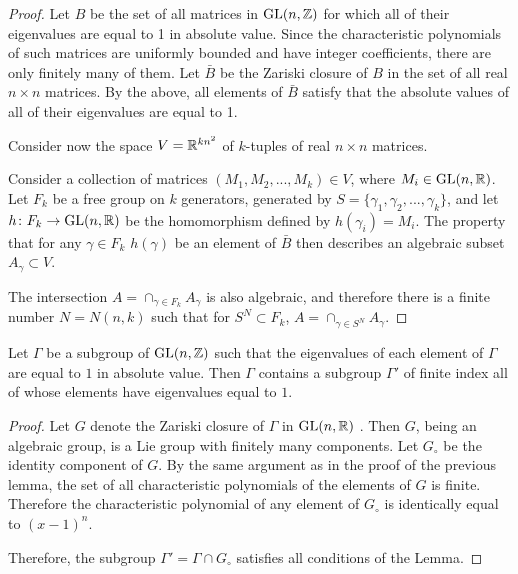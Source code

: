 \documentclass{amsart}
\begin{document}
\begin{proof}

Let $B$ be the set of all matrices in $\mathrm{GL}(n,{\Bbb Z})$
for which all of their eigenvalues are equal to 1 in absolute value.
Since the characteristic polynomials of such matrices
are uniformly bounded and have integer coefficients,
there are only finitely many of them.
Let $\bar{B}$ be the Zariski closure of $B$ in the set of all real
$n\times n$ matrices. By the above,
all elements of $\bar{B}$ satisfy that the absolute values of all
of their eigenvalues are equal to 1.

Consider now the space $V={\Bbb R}^{kn^{2}}$ of
$k$-tuples of real $n\times n$ matrices.

Consider a  collection of matrices $(M_1,M_2,...,M_k)\in V$,
where $M_i\in \mathrm{GL}(n,{\Bbb R})$.
Let $F_k$ be a free group on $k$ generators,
generated by $S=\{\gamma_1,\gamma_2,...,\gamma_k\}$,
and let $h\colon F_k\to \mathrm{GL}(n,{\Bbb R})$ be the
homomorphism defined by $h(\gamma_i)=M_i$.
The property that for any $\gamma\in F_k$ $h(\gamma)$
be an element of $\bar{B} $
then describes an algebraic subset $A_\gamma\subset V$.

The  intersection $A=\cap_{\gamma\in F_k}A_\gamma$
is also  algebraic, and therefore there is a finite number $N=N(n,k)$
such that for $S^N\subset  F_k$,
$A=\cap_{\gamma\in S^N}A_\gamma$.
\end{proof}

\begin{lem}\label{lem:eigen1}
Let $\Gamma$  be a subgroup of $\mathrm{GL}(n,{\Bbb Z})$ such that
the eigenvalues of each element of $\Gamma$
are equal to $1$ in  absolute value.
Then $\Gamma$ contains a   subgroup  $\Gamma'$ of finite index
all of whose  elements have eigenvalues equal to $1$.
\end{lem}

\begin{proof}
Let $G$ denote the Zariski closure of $\Gamma$ in  $\mathrm{GL}(n,{\Bbb R})$ .
Then $G$, being an algebraic group,
is a Lie group with finitely many components.
Let $G_\circ$ be the identity  component of $G$.
By the same argument as in the proof of the previous lemma,
the set of all characteristic polynomials
of the elements of $G$ is finite.
Therefore the characteristic polynomial
of any element of $G_\circ$
is identically equal to $(x-1)^n$.

Therefore, the subgroup $\Gamma'=\Gamma\cap G_\circ$
satisfies all conditions of the Lemma.
\end{proof}
\end{document}
